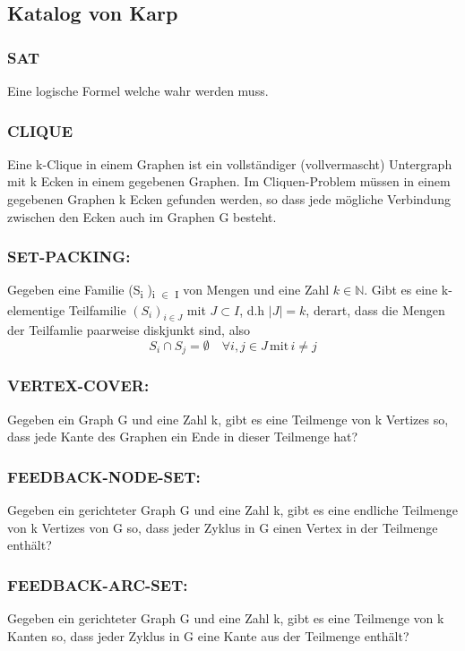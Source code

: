 \documentclass[11pt,twoside,landscape]{article}
\begin{document}
\begin{multicols}{2}
\section{Katalog von Karp}
\label{sec:org2e09066}
\subsubsection*{SAT}
\label{sec:orgd045b24}
Eine logische Formel welche wahr werden muss.
\subsubsection*{CLIQUE}
\label{sec:org92f8419}
Eine k-Clique in einem Graphen ist ein vollständiger (vollvermascht) Untergraph mit k Ecken in einem gegebenen Graphen. Im Cliquen-Problem müssen in einem gegebenen Graphen k Ecken gefunden werden, so dass jede mögliche Verbindung zwischen den Ecken auch im Graphen G besteht.
\subsubsection*{SET-PACKING:}
\label{sec:org12af18e}
Gegeben eine Familie (S\textsubscript{i} )\textsubscript{i \(\in\) I} von Mengen und eine Zahl \(k \in \mathbb{N}\). Gibt es eine k-elementige Teilfamilie \((S_i)_{i \in J}\) mit \(J \subset I\), d.h \(|J| = k\), derart, dass die Mengen der Teilfamlie paarweise diskjunkt sind, also
$$
S_i \cap S_j = \emptyset \quad \forall i, j \in J \, \text{mit} \, i \neq j
$$

\subsubsection*{VERTEX-COVER:}
\label{sec:org1159299}
Gegeben ein Graph G und eine Zahl k, gibt es eine Teilmenge von k Vertizes so, dass jede Kante des Graphen ein Ende in dieser Teilmenge hat?

\subsubsection*{FEEDBACK-NODE-SET:}
\label{sec:org130faed}
Gegeben ein gerichteter Graph G und eine Zahl k, gibt es eine endliche Teilmenge von k Vertizes von G so, dass jeder Zyklus in G einen Vertex in der Teilmenge enthält?

\subsubsection*{FEEDBACK-ARC-SET:}
\label{sec:org5aa9ac8}
Gegeben ein gerichteter Graph G und eine Zahl k, gibt es eine Teilmenge von k Kanten so, dass jeder Zyklus in G eine Kante aus der Teilmenge enthält?


\end{multicols}
\end{document}
